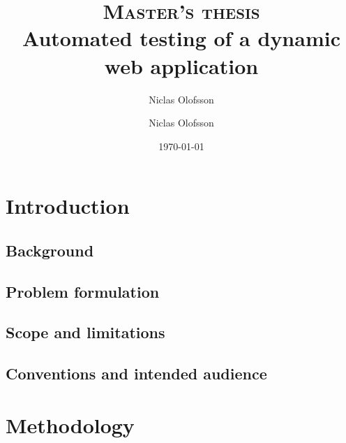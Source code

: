 \documentclass[a4paper]{report}
\author{Niclas Olofsson}
\title{\textsc{Master's thesis}\\\Huge\textbf{Automated testing of a dynamic web application}}
\author{Niclas Olofsson}
\date{\today}
\begin{document}
\renewcommand{\lstlistingname}{Code listing}

\maketitle
\newpage

\begin{abstract}

\end{abstract}

\renewcommand{\abstractname}{Acknowledgments}

\begin{abstract}

\end{abstract}

\setcounter{tocdepth}{4}
\tableofcontents
\thispagestyle{empty} %
\newpage

\setcounter{page}{1}

\chapter{Introduction}

  \section{Background}
  \label{sec:background}
  

  \section{Problem formulation}
  

  \section{Scope and limitations}
  

  \section{Conventions and intended audience}
  


\chapter{Methodology}
  
\end{document}
